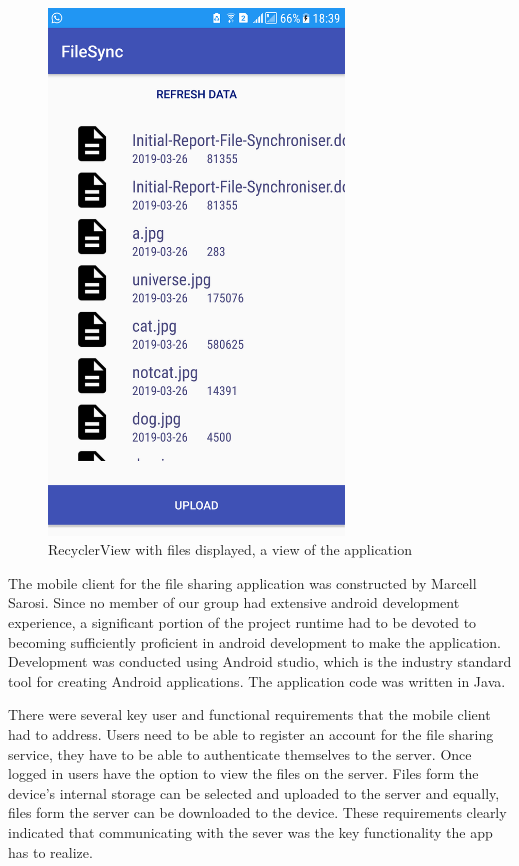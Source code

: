\documentclass[11pt]{article}
\begin{document}
\begin{figure} [H]
\caption{RecyclerView with files displayed, a view of the application}
\centering
\includegraphics[width=0.7\textwidth]{files.png}
\end{figure}


The mobile client for the file sharing application was constructed by Marcell Sarosi. Since no member of our group had extensive android development experience, a significant portion of the project runtime had to be devoted to becoming sufficiently proficient in android development to make the application. Development was conducted using Android studio, which is the industry standard tool for creating Android applications. The application code was written in Java.

There were several key user and functional requirements that the mobile client had to address. Users need to be able to register an account for the file sharing service, they have to be able to authenticate themselves to the server. Once logged in users have the option to view the files on the server. Files form the device’s internal storage can be selected and uploaded to the server and equally, files form the server can be downloaded to the device. These requirements clearly indicated that communicating with the sever was the key functionality the app has to realize.
\end{document}
